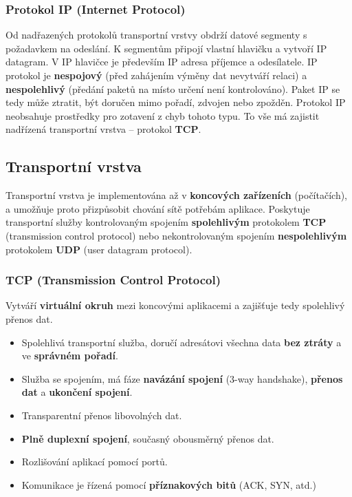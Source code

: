 \subsubsection{Protokol IP (Internet Protocol)}
Od nadřazených protokolů transportní vrstvy obdrží datové segmenty s požadavkem na odeslání. K segmentům připojí vlastní hlavičku a vytvoří IP datagram. V IP hlavičce je především IP adresa příjemce a odesílatele. IP protokol je \textbf{nespojový} (před zahájením výměny dat nevytváří relaci) a \textbf{nespolehlivý} (předání paketů na místo určení není kontrolováno). Paket IP se tedy může ztratit, být doručen mimo pořadí, zdvojen nebo zpožděn. Protokol IP neobsahuje prostředky pro zotavení z chyb tohoto typu. To vše má zajistit nadřízená transportní vrstva – protokol \textbf{TCP}.

\subsection{Transportní vrstva}
Transportní vrstva je implementována až v \textbf{koncových zařízeních} (počítačích), a umožňuje proto přizpůsobit chování sítě potřebám aplikace. Poskytuje transportní služby kontrolovaným spojením \textbf{spolehlivým} protokolem \textbf{TCP} (transmission control protocol) nebo nekontrolovaným spojením \textbf{nespolehlivým} protokolem \textbf{UDP} (user datagram protocol).

\subsubsection{TCP (Transmission Control Protocol)}
Vytváří \textbf{virtuální okruh} mezi koncovými aplikacemi a zajišťuje tedy spolehlivý přenos dat.
\begin{itemize}
	\item Spolehlivá transportní služba, doručí adresátovi všechna data \textbf{bez ztráty} a ve \textbf{správném pořadí}.
	\item Služba se spojením, má fáze \textbf{navázání spojení} (3-way handshake), \textbf{přenos dat} a \textbf{ukončení spojení}.
	\item Transparentní přenos libovolných dat.
	\item \textbf{Plně duplexní spojení}, současný obousměrný přenos dat.
	\item Rozlišování aplikací pomocí portů.
	\item Komunikace je řízená pomocí \textbf{příznakových bitů} (ACK, SYN, atd.)
\end{itemize}

